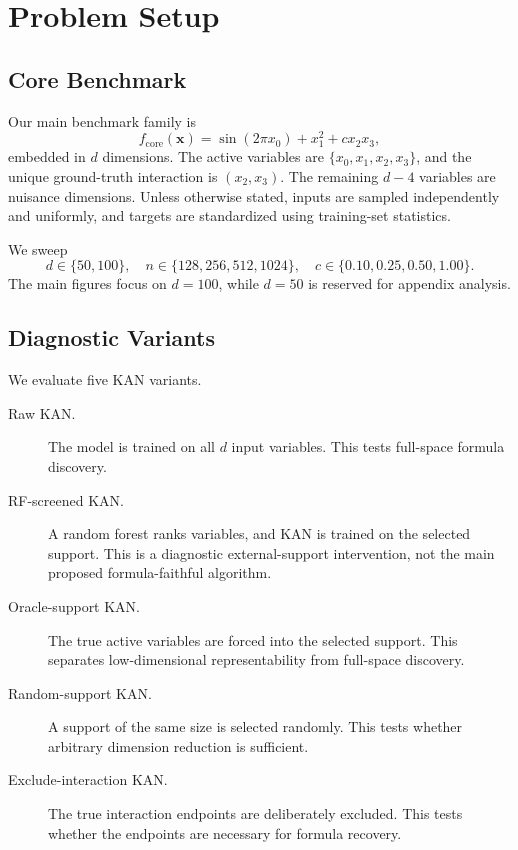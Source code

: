 \documentclass[11pt]{article}
\newcommand{\corefn}{f_{\mathrm{core}}}
\newcommand{\x}{\mathbf{x}}
\begin{document}
\section{Problem Setup}

\subsection{Core Benchmark}

Our main benchmark family is
\begin{equation}
    \corefn(\x)
    =
    \sin(2\pi x_0)
    +
    x_1^2
    +
    c x_2 x_3,
    \label{eq:core}
\end{equation}
embedded in $d$ dimensions. The active variables are $\{x_0,x_1,x_2,x_3\}$, and the unique ground-truth interaction is $(x_2,x_3)$. The remaining $d-4$ variables are nuisance dimensions. Unless otherwise stated, inputs are sampled independently and uniformly, and targets are standardized using training-set statistics.

We sweep
\[
d \in \{50,100\},
\quad
n \in \{128,256,512,1024\},
\quad
c \in \{0.10,0.25,0.50,1.00\}.
\]
The main figures focus on $d=100$, while $d=50$ is reserved for appendix analysis.

\subsection{Diagnostic Variants}

We evaluate five KAN variants.
\begin{description}
    \item[Raw KAN.] The model is trained on all $d$ input variables. This tests full-space formula discovery.
    \item[RF-screened KAN.] A random forest ranks variables, and KAN is trained on the selected support. This is a diagnostic external-support intervention, not the main proposed formula-faithful algorithm.
    \item[Oracle-support KAN.] The true active variables are forced into the selected support. This separates low-dimensional representability from full-space discovery.
    \item[Random-support KAN.] A support of the same size is selected randomly. This tests whether arbitrary dimension reduction is sufficient.
    \item[Exclude-interaction KAN.] The true interaction endpoints are deliberately excluded. This tests whether the endpoints are necessary for formula recovery.
\end{description}
\end{document}
